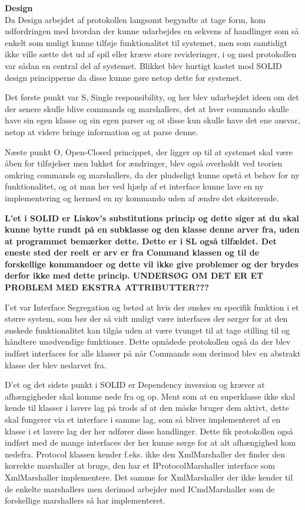 \textbf{Design}\\

Da Design arbejdet af protokollen langsomt begyndte at tage form, kom udfordringen med hvordan der kunne udarbejdes en sekvens af handlinger som så enkelt som muligt kunne tilføje funktionalitet til systemet, men som samtidigt ikke ville sætte det ud af spil eller kræve store revideringer, i og med protokollen var sådan en central del af systemet. Blikket blev hurtigt kastet mod SOLID design principperne da disse kunne gøre netop dette for systemet.

Det første punkt var S, Single responsibility, og her blev udarbejdet ideen om det der senere skulle blive commands og marshallers, det at hver commando skulle have sin egen klasse og sin egen parser og at disse kun skulle have det ene ansvar, netop at videre bringe information og at parse denne.

Næste punkt O, Open-Closed princippet, der ligger op til at systemet skal være åben for tilføjelser men lukket for ændringer, blev også overholdt ved teorien omkring commands og marshallers, da der pludseligt kunne opstå et behov for ny funktionalitet, og at man her ved hjælp af et interface kunne lave en ny implementering og hermed en ny kommando uden af ændre det eksiterende.

\textbf{L'et i SOLID er Liskov's substitutions princip og dette siger at du skal kunne bytte rundt på en subklasse og den klasse denne arver fra, uden at programmet bemærker dette. Dette er i \gls{SL} også tilfældet. Det eneste sted der reelt er arv er fra Command klassen og til de forskellige kommandoer og dette vil ikke give problemer og der brydes derfor ikke med dette princip. UNDERSØG OM DET ER ET PROBLEM MED EKSTRA ATTRIBUTTER???}

I'et var Interface Segregation og betød at hvis der ønskes en specifik funktion i et større system, som bør der så vidt muligt være interfaces der sørger for at den ønskede funktionalitet kan tilgås uden at være tvunget til at tage stilling til og håndtere unødvendige funktioner. Dette opnådede protokollen også da der blev indført interfaces for alle klasser på når Commands som derimod blev en abstrakt klasse der blev nedarvet fra.

D'et og det sidste punkt i SOLID er Dependency inversion og kræver at afhængigheder skal komme nede fra og op. Ment som at en superklasse ikke skal kende til klasser i lavere lag på trods af at den måske bruger dem aktivt, dette skal fungerer via et interface i samme lag, som så bliver implementeret af en klasse i et lavere lag der her udfører disse handlinger. Dette fik protokollen også indført med de mange interfaces der her kunne sørge for at alt afhængighed kom nedefra. Protocol klassen kender f.eks. ikke den XmlMarshaller der finder den korrekte marshaller at bruge, den har et IProtocolMarshaller interface som XmlMarshaller implementere. Det samme for XmlMarshaller der ikke kender til de enkelte marshallers men derimod arbejder med ICmdMarshaller som de forskellige marshallers så har implementeret.\\

